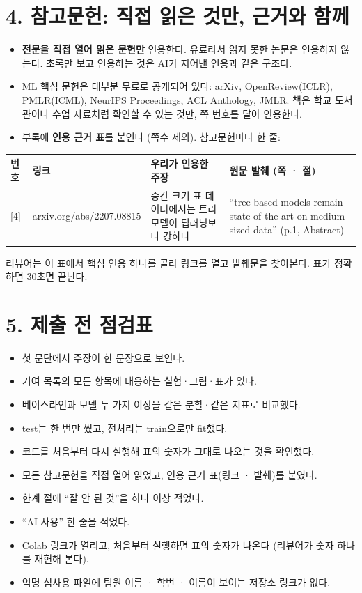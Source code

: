 \documentclass[11pt]{article}
\begin{document}
\section*{4. 참고문헌: 직접 읽은 것만, 근거와 함께}
\begin{itemize}
\item \textbf{전문을 직접 열어 읽은 문헌만} 인용한다. 유료라서 읽지 못한 논문은 인용하지 않는다. 초록만 보고 인용하는 것은 AI가 지어낸 인용과 같은 구조다.
\item ML 핵심 문헌은 대부분 무료로 공개되어 있다: arXiv, OpenReview(ICLR), PMLR(ICML), NeurIPS Proceedings, ACL Anthology, JMLR. 책은 학교 도서관이나 수업 자료처럼 확인할 수 있는 것만, 쪽 번호를 달아 인용한다.
\item 부록에 \textbf{인용 근거 표}를 붙인다 (쪽수 제외). 참고문헌마다 한 줄:
\end{itemize}
\begin{center}
\footnotesize
\begin{tabular}{@{}p{0.8cm}p{3.1cm}p{3.9cm}p{5.0cm}@{}}
\toprule
\textbf{번호} & \textbf{링크} & \textbf{우리가 인용한 주장} & \textbf{원문 발췌 (쪽 · 절)} \\
\midrule
{[4]} & arxiv.org/abs/2207.08815 & 중간 크기 표 데이터에서는 트리 모델이 딥러닝보다 강하다 & ``tree-based models remain state-of-the-art on medium-sized data'' (p.1, Abstract) \\
\bottomrule
\end{tabular}
\end{center}
\noindent 리뷰어는 이 표에서 핵심 인용 하나를 골라 링크를 열고 발췌문을 찾아본다. 표가 정확하면 30초면 끝난다.

\section*{5. 제출 전 점검표}
\begin{itemize}
\item[$\square$] 첫 문단에서 주장이 한 문장으로 보인다.
\item[$\square$] 기여 목록의 모든 항목에 대응하는 실험·그림·표가 있다.
\item[$\square$] 베이스라인과 모델 두 가지 이상을 같은 분할·같은 지표로 비교했다.
\item[$\square$] test는 한 번만 썼고, 전처리는 train으로만 fit했다.
\item[$\square$] 코드를 처음부터 다시 실행해 표의 숫자가 그대로 나오는 것을 확인했다.
\item[$\square$] 모든 참고문헌을 직접 열어 읽었고, 인용 근거 표(링크 · 발췌)를 붙였다.
\item[$\square$] 한계 절에 ``잘 안 된 것''을 하나 이상 적었다.
\item[$\square$] ``AI 사용'' 한 줄을 적었다.
\item[$\square$] Colab 링크가 열리고, 처음부터 실행하면 표의 숫자가 나온다 (리뷰어가 숫자 하나를 재현해 본다).
\item[$\square$] 익명 심사용 파일에 팀원 이름 · 학번 · 이름이 보이는 저장소 링크가 없다.
\end{itemize}
\end{document}
